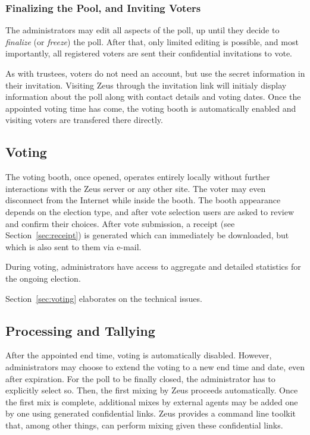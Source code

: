 \documentclass[letterpaper,10pt]{article}
\begin{document}
\subsubsection{Finalizing the Pool, and Inviting Voters}
The administrators may edit all aspects of the poll, up until they
decide to \emph{finalize} (or \emph{freeze}) the poll.
After that, only limited editing is possible, and most importantly,
all registered voters are sent their confidential invitations to vote.

As with trustees, voters do not need an account, but use the secret
information in their invitation.
Visiting Zeus through the invitation link will initialy display
information about the poll along with contact details and voting dates.
Once the appointed voting time has come, the voting booth is
automatically enabled and visiting voters are transfered there directly.

\subsection{Voting}
The voting booth, once opened, operates entirely locally without
further interactions with the Zeus server or any other site.
The voter may even disconnect from the Internet while inside the booth.
The booth appearance depends on the election type, and after vote
selection users are asked to review and confirm their choices.
After vote submission, a receipt (see Section~\ref{sec:receipt}) is
generated which can immediately be downloaded, but which is also sent
to them via e-mail.

During voting, administrators have access to aggregate and detailed
statistics for the ongoing election.

Section~\ref{sec:voting} elaborates on the technical issues.

\subsection{Processing and Tallying}
After the appointed end time, voting is automatically disabled.
However, administrators may choose to extend the voting to a new end
time and date, even after expiration.
For the poll to be finally closed,
the administrator has to explicitly select so.
Then, the first mixing by Zeus proceeds automatically.
Once the first mix is complete, additional mixes by external agents
may be added one by one using generated confidential links.
Zeus provides a command line toolkit that, among other things, can
perform mixing given these confidential links.
\end{document}
